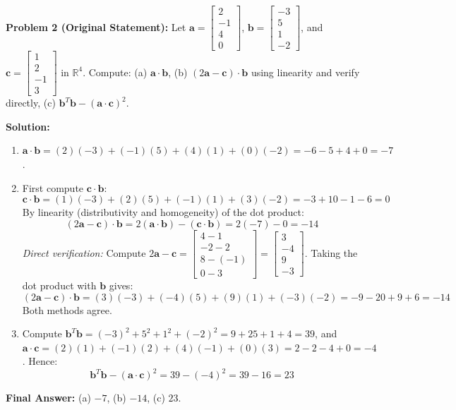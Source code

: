\documentclass[11pt, letterpaper]{article}
\theoremstyle{definition}
\theoremstyle{remark}
\begin{document}
\medskip
\textbf{Problem 2 (Original Statement):} Let $\mathbf{a} = \begin{bmatrix} 2 \\ -1 \\ 4 \\ 0 \end{bmatrix}$, $\mathbf{b} = \begin{bmatrix} -3 \\ 5 \\ 1 \\ -2 \end{bmatrix}$, and $\mathbf{c} = \begin{bmatrix} 1 \\ 2 \\ -1 \\ 3 \end{bmatrix}$ in $\mathbb{R}^4$. Compute: (a) $\mathbf{a} \cdot \mathbf{b}$, (b) $(2\mathbf{a} - \mathbf{c}) \cdot \mathbf{b}$ using linearity and verify directly, (c) $\mathbf{b}^T \mathbf{b} - (\mathbf{a} \cdot \mathbf{c})^2$.

\textbf{Solution:}
\begin{enumerate}[label=(\alph*)]
    \item $\mathbf{a} \cdot \mathbf{b} = (2)(-3) + (-1)(5) + (4)(1) + (0)(-2) = -6 - 5 + 4 + 0 = -7$.
    \item First compute $\mathbf{c} \cdot \mathbf{b}$:
    \[
    \mathbf{c} \cdot \mathbf{b} = (1)(-3) + (2)(5) + (-1)(1) + (3)(-2) = -3 + 10 - 1 - 6 = 0
    \]
    By linearity (distributivity and homogeneity) of the dot product:
    \[
    (2\mathbf{a} - \mathbf{c}) \cdot \mathbf{b} = 2(\mathbf{a} \cdot \mathbf{b}) - (\mathbf{c} \cdot \mathbf{b}) = 2(-7) - 0 = -14
    \]
    \textit{Direct verification:} Compute $2\mathbf{a} - \mathbf{c} = \begin{bmatrix} 4 - 1 \\ -2 - 2 \\ 8 - (-1) \\ 0 - 3 \end{bmatrix} = \begin{bmatrix} 3 \\ -4 \\ 9 \\ -3 \end{bmatrix}$. Taking the dot product with $\mathbf{b}$ gives:
    \[
    (2\mathbf{a} - \mathbf{c}) \cdot \mathbf{b} = (3)(-3) + (-4)(5) + (9)(1) + (-3)(-2) = -9 - 20 + 9 + 6 = -14
    \]
    Both methods agree.
    \item Compute $\mathbf{b}^T \mathbf{b} = (-3)^2 + 5^2 + 1^2 + (-2)^2 = 9 + 25 + 1 + 4 = 39$, and $\mathbf{a} \cdot \mathbf{c} = (2)(1) + (-1)(2) + (4)(-1) + (0)(3) = 2 - 2 - 4 + 0 = -4$. Hence:
    \[
    \mathbf{b}^T \mathbf{b} - (\mathbf{a} \cdot \mathbf{c})^2 = 39 - (-4)^2 = 39 - 16 = 23
    \]
\end{enumerate}
\textbf{Final Answer:} (a) $-7$, (b) $-14$, (c) $23$.
\end{document}
